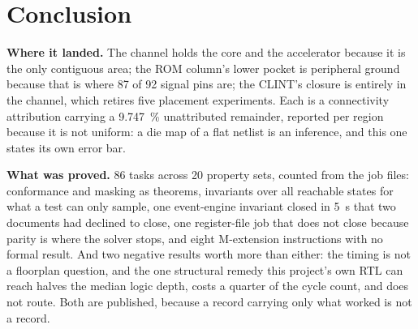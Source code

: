\documentclass[11pt,a4paper]{article}
\begin{document}
\section{Conclusion}
\label{sec:conc}

\textbf{Where it landed.} The channel holds the core and the
accelerator because it is the only contiguous area; the ROM column's lower
pocket is peripheral ground because that is where \num{87} of \num{92}
signal pins are; the CLINT's closure is entirely in the
channel, which retires five placement experiments. Each is a
connectivity attribution carrying a \SI{9.747}{\percent} unattributed
remainder, reported per region because it is not uniform: a die map of
a flat netlist is an inference, and this one states its own error bar.

\textbf{What was proved.} \num{86} tasks across \num{20} property sets,
counted from the job files: conformance and masking as theorems,
invariants over all reachable states for what a test can only sample,
one event-engine invariant closed in \SI{5}{\second} that two documents
had declined to close, one register-file job that does not close
because parity is where the solver stops, and eight M-extension
instructions with no formal result. And two negative results worth more
than either: the timing is not a floorplan question, and the one
structural remedy this project's own RTL can reach halves the median
logic depth, costs a quarter of the cycle count, and does not route.
Both are published, because a record carrying only what worked is not a
record.



\end{document}
